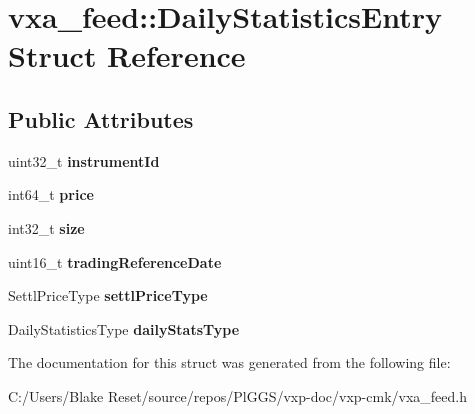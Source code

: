 \hypertarget{structvxa__feed_1_1_daily_statistics_entry}{}\section{vxa\+\_\+feed\+::Daily\+Statistics\+Entry Struct Reference}
\label{structvxa__feed_1_1_daily_statistics_entry}
\subsection*{Public Attributes}
\begin{DoxyCompactItemize}
\item 
\mbox{\label{structvxa__feed_1_1_daily_statistics_entry_ad9b82fccde60ab539213dbdb16943c09}} 
uint32\+\_\+t {\bfseries instrument\+Id}
\item 
\mbox{\label{structvxa__feed_1_1_daily_statistics_entry_a206a5563b3b80db022dbcc0e7874793d}} 
int64\+\_\+t {\bfseries price}
\item 
\mbox{\label{structvxa__feed_1_1_daily_statistics_entry_a792acd91f0dcf1ebda2db562ff3289dd}} 
int32\+\_\+t {\bfseries size}
\item 
\mbox{\label{structvxa__feed_1_1_daily_statistics_entry_af5fa85170b009c6ea9e48195b2cfbcb3}} 
uint16\+\_\+t {\bfseries trading\+Reference\+Date}
\item 
\mbox{\label{structvxa__feed_1_1_daily_statistics_entry_a3c25c28af338ba3ee2dfbe2e700f5a48}} 
Settl\+Price\+Type {\bfseries settl\+Price\+Type}
\item 
\mbox{\label{structvxa__feed_1_1_daily_statistics_entry_a37daf3db518bd82825d593b4072830d6}} 
Daily\+Statistics\+Type {\bfseries daily\+Stats\+Type}
\end{DoxyCompactItemize}


The documentation for this struct was generated from the following file\+:\begin{DoxyCompactItemize}
\item 
C\+:/\+Users/\+Blake Reset/source/repos/\+Pl\+G\+G\+S/vxp-\/doc/vxp-\/cmk/vxa\+\_\+feed.\+h\end{DoxyCompactItemize}
